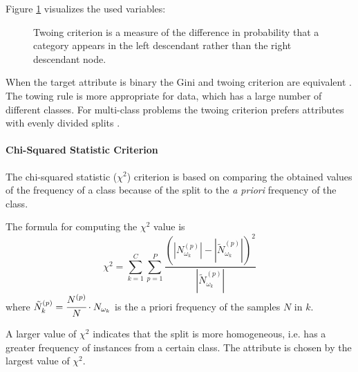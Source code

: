 Figure \ref{fig:twoingcriterion} visualizes the used variables:

\begin{figure}[!h] \centering
{}
\caption{Twoing criterion is a measure of the difference in probability that a category appears in the left descendant rather than the right descendant node. }
\label{fig:twoingcriterion}
\end{figure}

When the target attribute is binary the Gini and twoing criterion are equivalent \cite{shih1999families}. The towing rule is more appropriate for data, which has a large number of different classes. For multi-class problems the twoing criterion prefers attributes with evenly divided splits \cite[p. 57]{rokach2008data}.


\paragraph{Chi-Squared Statistic Criterion}

The chi-squared statistic ($\chi^2$) criterion is based on comparing the obtained values of the frequency of a class because of the split to the \textit{a priori} frequency of the class. 

\begin{definition}
The formula for computing the $\chi^2$ value is 
\begin{equation}
    \chi^2 = \sum_{k=1}^{C}\sum_{p=1}^{P} \frac{\left(\left| N_{\omega_k}^{(p)} \right| - \left| \tilde N_{\omega_k}^{(p)} \right| \right) ^2 }{ \left| \tilde N_{\omega_k}^{(p)} \right| }
\end{equation}
where $\tilde N_k^{(p)} = \cfrac{N^{(p)}}{N} \cdot N_{\omega_k}$ is the a priori frequency of the samples $N$ in $k$.
\end{definition}

A larger value of $\chi^2$ indicates that the split is more homogeneous, i.e. has a greater frequency of instances from a certain class. The attribute is chosen by the largest value of $\chi^2$.








